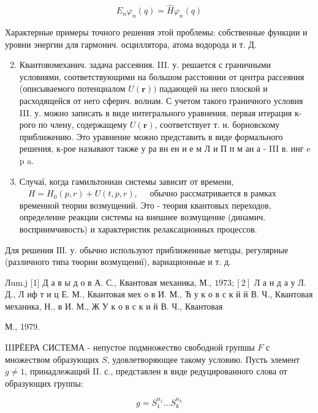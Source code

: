 \documentclass[10pt]{article}
\begin{document}
\[

E_{n} \varphi_{n}(q)=\hat{H} \varphi_{n}(q)

\]



Характерные примеры точного решения этой проблемы: собственные функции и уровни энергии для гармонич. осциллятора, атома водорода и т. Д.



\begin{enumerate}

  \setcounter{enumi}{1}

  \item Квантовомеханич. задача рассеяния. III. у. решается с граничными условиями, соответствующими на большом расстоянии от центра рассеяния (описываемого потенциалом $U(\boldsymbol{r}))$ падающей на него плоской и расходящейся от него сферич. волнам. С учетом такого граничного условия III. у. можно записать в виде интегрального уравнения, первая итерация к-рого по члену, содержащему $U(\boldsymbol{r})$, соответствует т. н. борновскому приближению. Это уравнение можно представить в виде формального решения, к-рое называют также у ра вн ен и е м Л и П п м ан а - III в. инг e p a.



  \item Случаї, когда гамильтониан системы зависит от времени, $\quad H=H_{0}(p, r)+U(t, p, r), \quad$ обычно рассматривается в рамках временной теории возмущений. Это - теория квантовых переходов, определение реакции системы на внешнее возмущение (динамич. восприимчивость) и характеристик релаксационных процессов.



\end{enumerate}



Для решения ІІІ. у. обычно используют приближенные методы, регулярные (различного типа төории возмущениї), вариационные и т. д.



Лum.j [1] Д а в ы д о в А. С., Квантовая механика, М., $1973 ;[2]$ Л а н д а у Л. Д., Л иф т и ц Е. М., Квантовая мех о в И. М., Ћ у к о в с к й й В. Ч., Квантовая механика, Н., в И. М., Ж У к о в с к и й В. Ч., Квантовая

М., 1979.



IIIРЁЕРА СИСТЕМА - непустое подмножество свободной групшы $F$ с множеством образующих $S$, удовлетворяющее такому условию. Пусть элемент $g \neq 1$, принадлежащий II. с., представлен в виде редуцированного слова от образующих группы:



\[

g=S_{1}^{n_{1}} \ldots S_{k}^{n_{k}}

\]
\end{document}

